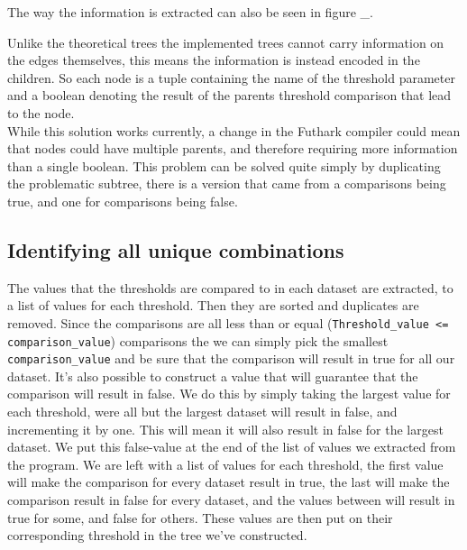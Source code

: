 The way the information is extracted can also be seen in figure \_. 

Unlike the theoretical trees the implemented trees cannot carry information on
the edges themselves, this means the information is instead encoded in the
children. So each node is a tuple containing the name of the threshold
parameter and a boolean denoting the result of the parents threshold
comparison that lead to the node.\\
While this solution works currently, a change in the Futhark compiler could
mean that nodes could have multiple parents, and therefore requiring more
information than a single boolean. This problem can be solved quite simply by
duplicating the problematic subtree, there is a version that came from a
comparisons being true, and one for comparisons being false.

\subsection{Identifying all unique combinations}
The values that the thresholds are compared to in each dataset are extracted,
to a list of values for each threshold. Then they are sorted and duplicates are
removed. Since the comparisons are all less than or equal
(\texttt{Threshold\_value <= comparison\_value}) comparisons the we can simply
pick the smallest \texttt{comparison\_value} and be sure that the comparison
will result in true for all our dataset. It's also possible to construct a
value that will guarantee that the comparison will result in false. We do this
by simply taking the largest value for each threshold, were all but the largest
dataset will result in false, and incrementing it by one. This will mean it
will also result in false for the largest dataset. We put this false-value at
the end of the list of values we extracted from the program. We are left with a
list of values for each threshold, the first value will make the comparison for
every dataset result in true, the last will make the comparison result in false
for every dataset, and the values between will result in true for some, and
false for others. These values are then put on their corresponding threshold in
the tree we've constructed.
\\


